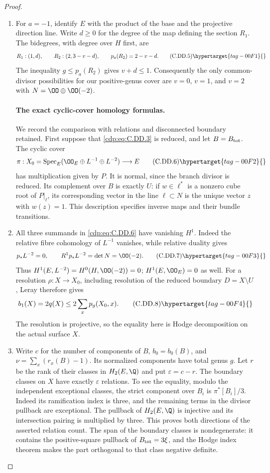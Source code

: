 \begin{proof}
\begin{enumerate}[label={$\langle1\rangle$\arabic*.},leftmargin=*]
\item For $a=-1$, identify $E$ with the product of the base
and the projective direction line. Write $d\ge0$ for
the degree of the map defining the section $R_1$.
The bidegrees, with degree over $H$ first, are
\[
 R_1:(1,d),\qquad R_2:(2,3-v-d),\qquad
 p_a(R_2)=2-v-d.
\tag{C.DD.5}\hypertarget{tag-00F1}{}\label{cdp:eq:C.DD.5}
\]
The inequality $g\le p_a(R_2)$ gives $v+d\le1$.
Consequently the only common-divisor possibilities
for our positive-genus cover are $v=0$, $v=1$, and
$v=2$ with $N=\OO\oplus\OO(-2)$.

\paragraph{The exact cyclic-cover homology formulas.}
We record the comparison with relations and disconnected
boundary retained. First suppose that \eqref{cdp:eq:C.DD.3} is reduced,
and let $B=B_{\rm tot}$. The cyclic cover
\[
 \pi:X_0=\operatorname{Spec}_E
       (\OO_E\oplus L^{-1}\oplus L^{-2})\longrightarrow E
\tag{C.DD.6}\hypertarget{tag-00F2}{}\label{cdp:eq:C.DD.6}
\]
has multiplication given by $P$. It is normal, since
the branch divisor is reduced. Its complement over
$B$ is exactly $U$: if $w\in\ell^*$ is a nonzero
cube root of $P|_\ell$, its corresponding vector in
the line $\ell\subset N$ is the unique vector $z$
with $w(z)=1$. This description specifies inverse
maps and their bundle transitions.

\item All three summands in \eqref{cdp:eq:C.DD.6} have vanishing $H^1$.
Indeed the relative fibre cohomology of $L^{-1}$
vanishes, while relative duality gives
\[
 p_*L^{-2}=0,\qquad R^1p_*L^{-2}=\det N=\OO(-2).
\tag{C.DD.7}\hypertarget{tag-00F3}{}\label{cdp:eq:C.DD.7}
\]
Thus $H^1(E,L^{-2})=H^0(H,\OO(-2))=0$;
$H^1(E,\OO_E)=0$ as well. For a resolution
$\rho:X\to X_0$, including resolution of the reduced
boundary $D=X\setminus U$, Leray therefore gives
\[
 b_1(X)=2q(X)\le2\sum_x p_g(X_0,x).
\tag{C.DD.8}\hypertarget{tag-00F4}{}\label{cdp:eq:C.DD.8}
\]
The resolution is projective, so the equality here
is Hodge decomposition on the actual surface $X$.

\item Write $c$ for the number of components of $B$,
$b_0=b_0(B)$, and
$\nu=\sum_x(r_x(B)-1)$. Its normalized components
have total genus $g$. Let $r$ be the rank of their
classes in $H_2(E,\Q)$ and put $\varepsilon=c-r$.
The boundary classes on $X$ have exactly
$\varepsilon$ relations. To see the equality, modulo
the independent exceptional classes, the strict
component over $B_i$ is $\pi^*[B_i]/3$.
Indeed its ramification index is three, and the
remaining terms in the divisor pullback are exceptional.
The pullback of $H_2(E,\Q)$ is injective and its
intersection pairing is multiplied by three.
This proves both directions of the asserted relation
count. The span of the boundary classes is
nondegenerate: it contains the positive-square
pullback of $B_{\rm tot}=3\xi$, and the Hodge index
theorem makes the part orthogonal to that class
negative definite.


\end{enumerate}
\end{proof}
